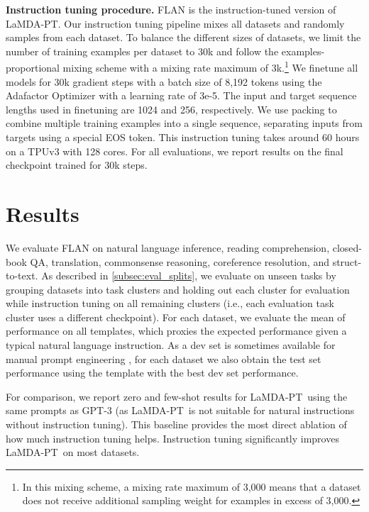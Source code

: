 \documentclass{article} %
\newcommand{\flan}{FLAN}
\newcommand{\baselm}{LaMDA-PT}
\begin{document}
\textbf{Instruction tuning procedure.}
\flan{} is the instruction-tuned version of \baselm. 
Our instruction tuning pipeline mixes all datasets and randomly samples from each dataset.
To balance the different sizes of datasets, we limit the number of training examples per dataset to 30k and follow the examples-proportional mixing scheme \citep{raffel2019exploring} with a mixing rate maximum of 3k.\footnote{In this mixing scheme, a mixing rate maximum of 3,000 means that a dataset does not receive additional sampling weight for examples in excess of 3,000.}
We finetune all models for 30k gradient steps with a batch size of 8,192 tokens using the Adafactor Optimizer \citep{shazeer2018adafactor} with a learning rate of 3e-5. 
The input and target sequence lengths used in finetuning are 1024 and 256, respectively. 
We use packing \citep{raffel2019exploring} to combine multiple training examples into a single sequence, separating inputs from targets using a special EOS token.
This instruction tuning takes around 60 hours on a TPUv3 with 128 cores.
For all evaluations, we report results on the final checkpoint trained for 30k steps.

\vspace{-1mm}
\section{Results}\label{sec:results}
\vspace{-2mm}
We evaluate \flan{} on natural language inference, reading comprehension, closed-book QA, translation, commonsense reasoning, coreference resolution, and struct-to-text. 
As described in \cref{subsec:eval_splits}, we evaluate on unseen tasks by grouping datasets into task clusters and holding out each cluster for evaluation while instruction tuning on all remaining clusters (i.e., each evaluation task cluster uses a different checkpoint).
For each dataset, we evaluate the mean of performance on all templates, which proxies the expected performance given a typical natural language instruction.
As a dev set is sometimes available for manual prompt engineering \citep{brown2020language}, for each dataset we also obtain the test set performance using the template with the best dev set performance.

For comparison, we report zero and few-shot results for \baselm\ using the same prompts as GPT-3 (as \baselm\ is not suitable for natural instructions without instruction tuning).
This baseline provides the most direct ablation of how much instruction tuning helps.
Instruction tuning significantly improves \baselm\ on most datasets.
\end{document}
